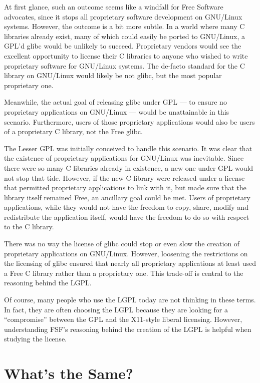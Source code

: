 At first glance, such an outcome seems like a windfall for Free Software
advocates, since it stops all proprietary software development on
GNU/Linux systems. However, the outcome is a bit more subtle. In a world
where many C libraries already exist, many of which could easily be ported
to GNU/Linux, a GPL'd glibc would be unlikely to succeed. Proprietary
vendors would see the excellent opportunity to license their C libraries
to anyone who wished to write proprietary software for GNU/Linux systems.
The de-facto standard for the C library on GNU/Linux would likely be not
glibc, but the most popular proprietary one.

Meanwhile, the actual goal of releasing glibc under GPL --- to ensure no
proprietary applications on GNU/Linux --- would be unattainable in this
scenario. Furthermore, users of those proprietary applications would also
be users of a proprietary C library, not the Free glibc.

The Lesser GPL was initially conceived to handle this scenario. It was
clear that the existence of proprietary applications for GNU/Linux was
inevitable. Since there were so many C libraries already in existence, a
new one under GPL would not stop that tide. However, if the new C library
were released under a license that permitted proprietary applications
to link with it, but made sure that the library itself remained Free,
an ancillary goal could be met. Users of proprietary applications, while
they would not have the freedom to copy, share, modify and redistribute
the application itself, would have the freedom to do so with respect to
the C library.

There was no way the license of glibc could stop or even slow the creation
of proprietary applications on GNU/Linux. However, loosening the
restrictions on the licensing of glibc ensured that nearly all proprietary
applications at least used a Free C library rather than a proprietary one.
This trade-off is central to the reasoning behind the LGPL\@.

Of course, many people who use the LGPL today are not thinking in these
terms. In fact, they are often choosing the LGPL because they are looking
for a ``compromise'' between the GPL and the X11-style liberal licensing.
However, understanding FSF's reasoning behind the creation of the LGPL is
helpful when studying the license.


\section{What's the Same?}


